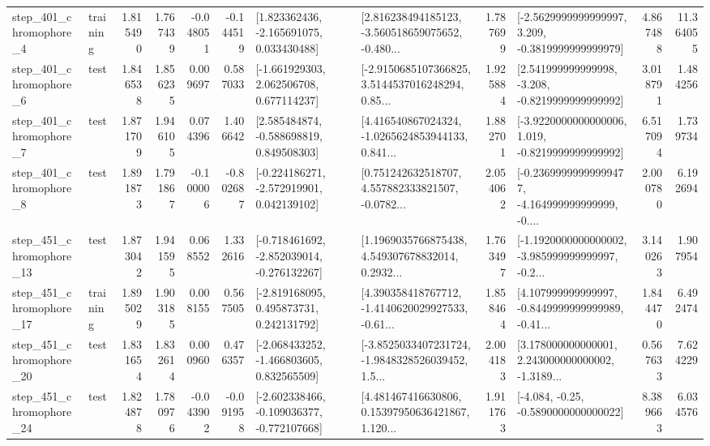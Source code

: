 \begin{tabular}{llrrrrllrlrr}
   step\_401\_chromophore\_4 &  training &      1.815490 &    1.767439 &     -0.048051 & -0.144519 &    [1.823362436, -2.165691075, 0.033430488] &  [2.816238494185123, -3.560518659075652, -0.480... &       1.787699 &  [-2.5629999999999997, 3.209, -0.3819999999999979] &            4.867488 &         11.364055 \\
   step\_401\_chromophore\_6 &      test &      1.846538 &    1.856235 &      0.009697 &  0.587033 &    [-1.661929303, 2.062506708, 0.677114237] &  [-2.9150685107366825, 3.5144537016248294, 0.85... &       1.925884 &   [2.541999999999998, -3.208, -0.8219999999999992] &            3.018791 &          1.484256 \\
   step\_401\_chromophore\_7 &      test &      1.871709 &    1.946105 &      0.074396 &  1.406642 &    [2.585484874, -0.588698819, 0.849508303] &  [4.416540867024324, -1.0265624853944133, 0.841... &       1.882701 &  [-3.9220000000000006, 1.019, -0.8219999999999992] &            6.517094 &          1.739734 \\
   step\_401\_chromophore\_8 &      test &      1.891873 &    1.791867 &     -0.100006 & -0.802687 &   [-0.224186271, -2.572919901, 0.042139102] &  [0.751242632518707, 4.557882333821507, -0.0782... &       2.054062 &  [-0.23699999999999477, -4.164999999999999, -0.... &            2.000780 &          6.192694 \\
  step\_451\_chromophore\_13 &      test &      1.873042 &    1.941595 &      0.068552 &  1.332616 &  [-0.718461692, -2.852039014, -0.276132267] &  [1.1969035766875438, 4.549307678832014, 0.2932... &       1.763497 &  [-1.1920000000000002, -3.985999999999997, -0.2... &            3.140263 &          1.907954 \\
  step\_451\_chromophore\_17 &  training &      1.895029 &    1.903185 &      0.008155 &  0.567505 &    [-2.819168095, 0.495873731, 0.242131792] &  [4.390358418767712, -1.4140620029927533, -0.61... &       1.858464 &  [4.107999999999997, -0.8449999999999989, -0.41... &            1.844470 &          6.492474 \\
  step\_451\_chromophore\_20 &      test &      1.831654 &    1.832614 &      0.000960 &  0.476357 &   [-2.068433252, -1.466803605, 0.832565509] &  [-3.8525033407231724, -1.9848328526039452, 1.5... &       2.004183 &  [3.178000000000001, 2.243000000000002, -1.3189... &            0.567633 &          7.624229 \\
  step\_451\_chromophore\_24 &      test &      1.824878 &    1.780976 &     -0.043902 & -0.091958 &  [-2.602338466, -0.109036377, -0.772107668] &  [4.481467416630806, 0.15397950636421867, 1.120... &       1.911763 &               [-4.084, -0.25, -0.5890000000000022] &            8.389663 &          6.034576 \\

\end{tabular}
